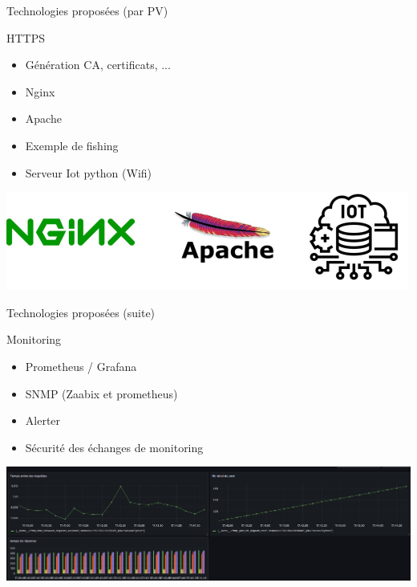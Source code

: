 \documentclass[12pt, handout]{beamer}
\begin{document}
\begin{frame}{Technologies proposées (par PV)}

\begin{block}{HTTPS}
\begin{itemize}
\item Génération CA, certificats, ...
\item Nginx
\item Apache
\item Exemple de fishing
\item Serveur Iot python (Wifi)
\end{itemize}
\end{block}

\begin{center}
\includegraphics[scale=0.5]{./ressource/httpsPresentation}
\end{center}
\end{frame}
\begin{frame}{Technologies proposées (suite)}

\begin{block}{Monitoring}
\begin{itemize}
\item Prometheus / Grafana
\item SNMP (Zaabix et prometheus)
\item Alerter 
\item Sécurité des échanges de monitoring
\end{itemize}
\end{block}
\begin{center}
\includegraphics[scale=0.2]{./ressource/exPanel.png}
\end{center}
\end{frame}
\end{document}
